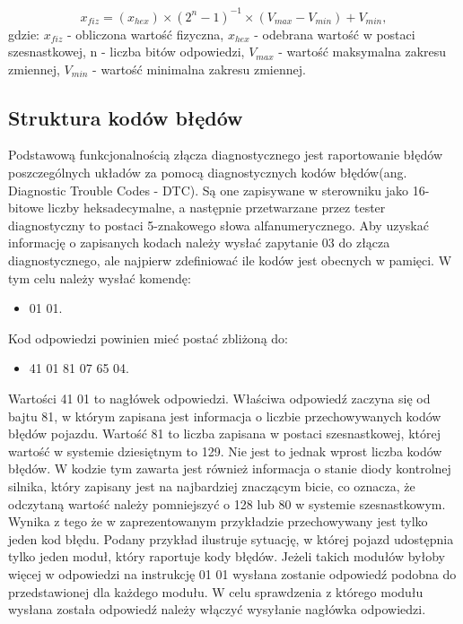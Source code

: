 \documentclass[12pt, twoside]{article} %
\numberwithin{equation}{subsection}
\numberwithin{figure}{section}
\numberwithin{table}{section}
\begin{document}
	\begin{equation}
	x_{fiz} = (x_{hex}) \times {(2^n-1)}^{-1} \times (V_{max} - V_{min}) + V_{min},
	\end{equation}			
	gdzie: $x_{fiz}$ - obliczona wartość fizyczna, $x_{hex}$ - odebrana wartość w postaci szesnastkowej, n - liczba bitów odpowiedzi, $V_{max}$ - wartość maksymalna zakresu zmiennej, $V_{min}$ - wartość minimalna zakresu zmiennej.
		
		\newpage
		
		\subsection{Struktura kodów błędów}
		
		\hspace{0.5cm}Podstawową funkcjonalnością złącza diagnostycznego jest raportowanie błędów poszczególnych układów za pomocą diagnostycznych kodów błędów(ang. Diagnostic Trouble Codes - DTC). Są one zapisywane w sterowniku jako 16-bitowe liczby heksadecymalne, a następnie przetwarzane przez tester diagnostyczny to postaci 5-znakowego słowa alfanumerycznego. Aby uzyskać informację o zapisanych kodach należy wysłać zapytanie 03 do złącza diagnostycznego, ale najpierw zdefiniować ile kodów jest obecnych w pamięci. W tym celu należy wysłać komendę:
		
		\begin{itemize}
			\item{01 01.}
		\end{itemize}
		Kod odpowiedzi powinien mieć postać zbliżoną do: 

		\begin{itemize}
			\item{41 01 81 07 65 04.}
		\end{itemize}
		
		Wartości 41 01 to nagłówek odpowiedzi. Właściwa odpowiedź zaczyna się od bajtu 81, w którym zapisana jest informacja o liczbie przechowywanych kodów błędów pojazdu. Wartość 81 to liczba zapisana w postaci szesnastkowej, której wartość w systemie dziesiętnym to 129. Nie jest to jednak wprost liczba kodów błędów. W kodzie tym zawarta jest również informacja o stanie diody kontrolnej silnika, który zapisany jest na najbardziej znaczącym bicie, co oznacza, że odczytaną wartość należy pomniejszyć o 128 lub 80 w systemie szesnastkowym. Wynika z tego że w zaprezentowanym przykładzie przechowywany jest tylko jeden kod błędu. Podany przykład ilustruje sytuację, w której pojazd udostępnia tylko jeden moduł, który raportuje kody błędów. Jeżeli takich modułów byłoby więcej w odpowiedzi na instrukcję 01 01 wysłana zostanie odpowiedź podobna do przedstawionej dla każdego modułu. W celu sprawdzenia z którego modułu wysłana została odpowiedź należy włączyć wysyłanie nagłówka odpowiedzi.
		
\end{document}
